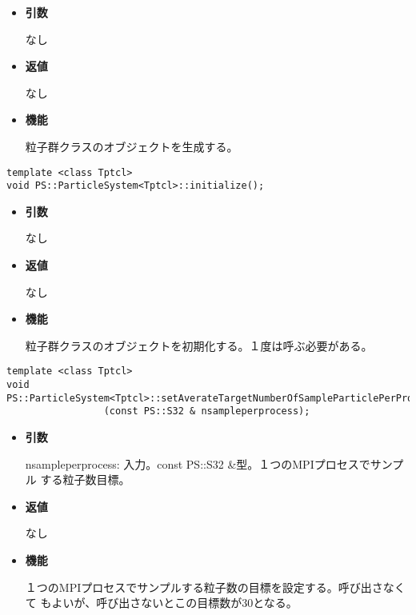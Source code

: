 \begin{itemize}

\item {\bf 引数}

なし

\item {\bf 返値}

なし

\item {\bf 機能}

粒子群クラスのオブジェクトを生成する。

\end{itemize}


\begin{screen}
\begin{verbatim}
template <class Tptcl>
void PS::ParticleSystem<Tptcl>::initialize();
\end{verbatim}
\end{screen}

\begin{itemize}

\item {\bf 引数}

なし

\item {\bf 返値}

なし

\item {\bf 機能}

粒子群クラスのオブジェクトを初期化する。１度は呼ぶ必要がある。


\end{itemize}


\begin{screen}
\begin{verbatim}
template <class Tptcl>
void PS::ParticleSystem<Tptcl>::setAverateTargetNumberOfSampleParticlePerProcess
                 (const PS::S32 & nsampleperprocess);
\end{verbatim}
\end{screen}

\begin{itemize}

\item {\bf 引数}

nsampleperprocess: 入力。const PS::S32 \&型。１つのMPIプロセスでサンプル
する粒子数目標。

\item {\bf 返値}

なし

\item {\bf 機能}

１つのMPIプロセスでサンプルする粒子数の目標を設定する。呼び出さなくて
もよいが、呼び出さないとこの目標数が30となる。

\end{itemize}

